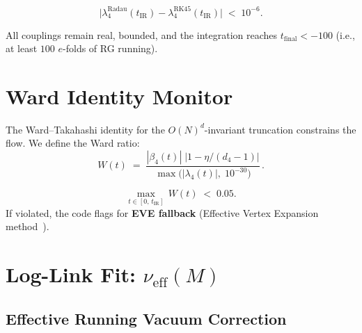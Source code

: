 \documentclass[11pt,a4paper]{article}
\theoremstyle{definition}
\theoremstyle{plain}
\theoremstyle{remark}
\newcommand{\nueff}{\nu_{\mathrm{eff}}}
\begin{document}
\begin{passcriterion}[title=Integrator Agreement]
\begin{equation}
  \bigl|\lambda_4^{\text{Radau}}(t_{\text{IR}})
  - \lambda_4^{\text{RK45}}(t_{\text{IR}})\bigr|
  \;<\;10^{-6}.
  \label{eq:int_agree}
\end{equation}
\end{passcriterion}

\begin{passcriterion}[title=Flow Stability]
All couplings remain real, bounded, and the integration reaches
$t_{\text{final}}<-100$ (i.e., at least $100$ $e$-folds of RG running).
\end{passcriterion}


\section{Ward Identity Monitor}
\label{sec:ward}

The Ward--Takahashi identity for the $O(N)^d$-invariant truncation
constrains the flow.  We define the Ward ratio:
\begin{equation}
  W(t) \;=\;
  \frac{|\beta_4(t)|\;\bigl|1-\eta/(d_4-1)\bigr|}
       {\max\bigl(|\lambda_4(t)|,\;10^{-30}\bigr)}\,.
  \label{eq:ward}
\end{equation}

\begin{passcriterion}[title=Ward Identity]
\begin{equation}
  \max_{t\in[0,\,t_{\text{IR}}]}\,W(t) \;<\; 0.05.
  \label{eq:ward_pass}
\end{equation}
If violated, the code flags for \textbf{EVE fallback}
(Effective Vertex Expansion method~\cite{carrozza2017}).
\end{passcriterion}


\section{Log-Link Fit: $\nueff(M)$}
\label{sec:loglink}

\subsection{Effective Running Vacuum Correction}
\end{document}
